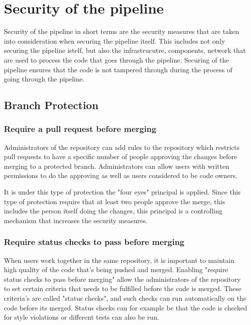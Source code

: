 \section{Security of the pipeline}
Security of the pipeline in short terms are the security measures that are taken into consideration when securing the pipeline itself. This includes not only securing the pipeline istelf, but also the infrastrucutre, components, network that are used to process the code that goes through the pipeline. Securing of the pipeline ensures that the code is not tampered through during the process of going through the pipeline. 


\subsection{Branch Protection}

\subsubsection{Require a pull request before merging}
Administrators of the repository can add rules to the repository which restricts pull requests to have a specific number of people approving the changes before merging to a protected branch. Administrators can allow users with written permissions to do the approving as well as users considered to be code owners. \cite{ProtectedBranches}

It is under this type of protection the "four eyes" principal is applied. Since this type of protection require that at least two people approve the merge, this includes the person itself doing the changes, this principal is a controlling mechanism that increases the security measures. 
\\
\subsubsection{Require status checks to pass before merging}
When users work together in the same repository, it is important to maintain high quality of the code that's being pushed and merged. Enabling "require status checks to pass before merging" allow the administrators of the repository to set certain criteria that needs to be fulfilled before the code is merged. These criteria's are called "status checks", and such checks can run automatically on the code before its merged. Status checks can for example be that the code is checked for style violations or different tests can also be run. \cite{ProtectedBranches}
\newpage
